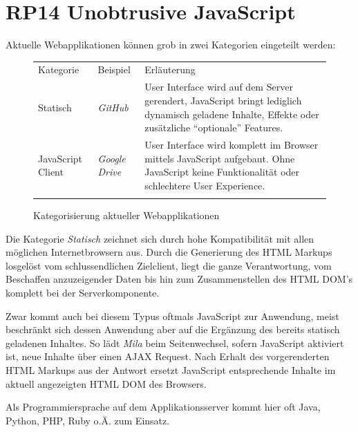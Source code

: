 \section{RP14 Unobtrusive JavaScript}
\label{sec:principle-rp14-unobtrusive-javascript}

Aktuelle Webapplikationen können grob in zwei Kategorien eingeteilt werden:

\begin{figure}[H]
	\begin{table}[H]
		\tablestyle
		\tablealtcolored
		\begin{tabularx}{\textwidth}{l l X}
			\tableheadcolor
				\tablehead Kategorie &
				\tablehead Beispiel &
				\tablehead Erläuterung
				\tabularnewline
			\tablebody
				Statisch &
				\emph{GitHub} \cite{GitHub} &
				User Interface wird auf dem Server gerendert, JavaScript bringt lediglich dynamisch geladene Inhalte, Effekte oder zusätzliche ``optionale'' Features.
				\tabularnewline

				JavaScript Client &
				\emph{Google Drive} \cite{GoogleDrive} &
				User Interface wird komplett im Browser mittels JavaScript aufgebaut. Ohne JavaScript keine Funktionalität oder schlechtere User Experience.
				\tabularnewline
			\tableend
		\end{tabularx}
	\end{table}
	\caption{Kategorisierung aktueller Webapplikationen}
	\label{tab:current-webapplication-categories}
\end{figure}

Die Kategorie \emph{Statisch} zeichnet sich durch hohe Kompatibilität mit allen möglichen Internetbrowsern aus. Durch die Generierung des HTML Markups losgelöst vom schlussendlichen Zielclient, liegt die ganze Verantwortung, vom Beschaffen anzuzeigender Daten bis hin zum Zusammenstellen des HTML \gls{DOM}'s komplett bei der Serverkomponente.

Zwar kommt auch bei diesem Typus oftmals JavaScript zur Anwendung, meist beschränkt sich dessen Anwendung aber auf die Ergänzung des bereits statisch geladenen Inhaltes. So lädt \emph{Mila} \cite{Mila} beim Seitenwechsel, sofern JavaScript aktiviert ist, neue Inhalte über einen \gls{AJAX} Request. Nach Erhalt des vorgerenderten HTML Markups aus der Antwort ersetzt JavaScript entsprechende Inhalte im aktuell angezeigten HTML \gls{DOM} des Browsers.

Als Programmiersprache auf dem Applikationsserver kommt hier oft Java, Python, PHP, Ruby o.Ä. zum Einsatz.

